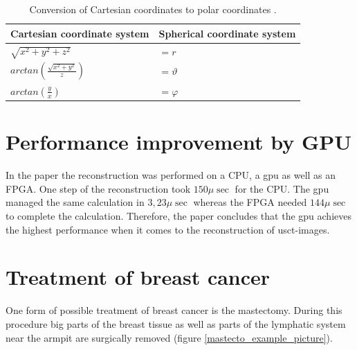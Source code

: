 \begin{table}[H]
\centering
\begin{tabular}{|ll|}
\hline
\textbf{Cartesian coordinate system} & \textbf{Spherical coordinate system}                                                                            \\ \hline
$\sqrt{x^2+y^2+z^2} $                               & $= r$ \\
$arctan( \frac{\sqrt{x^2+y^2}}{z} ) $  & $= \vartheta$ \\ 
$arctan( \frac{y}{x} ) $               & $= \varphi$                                                  \\ \hline
\end{tabular}
\caption{Conversion of Cartesian coordinates to polar coordinates \cite{Bronstein2005TaschenbuchMathematik}. }
\label{table_cart_to_Pol}
\end{table}




\section{Performance improvement by GPU}

In the paper \cite{Gohringer2011ReconfigurableEvaluation} the reconstruction was performed on a CPU, a \ac{gpu} as well as an FPGA. One step of the reconstruction took $150\mu \sec$ for the CPU. The \ac{gpu} managed the same calculation in $3,23 \mu \sec$ whereas the FPGA needed $144 \mu \sec$ to complete the calculation. Therefore, the paper concludes that the \ac{gpu} achieves the highest performance when it comes to the reconstruction of \ac{usct}-images. 


\section{Treatment of breast cancer}

One form of possible treatment of breast cancer is the mastectomy. During this procedure big parts of the breast tissue as well as parts of the lymphatic system near the armpit are surgically removed (figure \ref{mastecto_example_picture}).  


